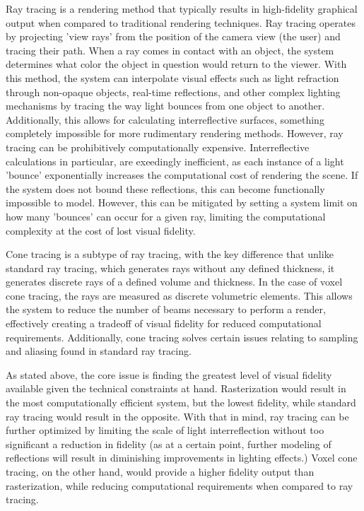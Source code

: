 \documentclass[onecolumn, draftclsnofoot,10pt, compsoc]{IEEEtran}
\newcounter{threesection}[subsubsection]
\newcounter{foursection}[threesection]
\begin{document}
Ray tracing is a rendering method that typically results in high-fidelity graphical output when compared to traditional rendering techniques. Ray tracing operates by projecting 'view rays' from the position of the camera view (the user) and tracing their path. When a ray comes in contact with an object, the system determines what color the object in question would return to the viewer. With this method, the system can interpolate visual effects such as light refraction through non-opaque objects, real-time reflections, and other complex lighting mechanisms by tracing the way light bounces from one object to another. Additionally, this allows for calculating interreflective surfaces, something completely impossible for more rudimentary rendering methods. However, ray tracing can be prohibitively computationally expensive. Interreflective calculations in particular, are exeedingly inefficient, as each instance of a light 'bounce' exponentially increases the computational cost of rendering the scene. If the system does not bound these reflections, this can become functionally impossible to model. However, this can be mitigated by setting a system limit on how many 'bounces' can occur for a given ray, limiting the computational complexity at the cost of lost visual fidelity. 

Cone tracing is a subtype of ray tracing, with the key difference that unlike standard ray tracing, which generates rays without any defined thickness, it generates discrete rays of a defined volume and thickness. In the case of voxel cone tracing, the rays are measured as discrete volumetric elements. This allows the system to reduce the number of beams necessary to perform a render, effectively creating a tradeoff of visual fidelity for reduced computational requirements. Additionally, cone tracing solves certain issues relating to sampling and aliasing found in standard ray tracing.

As stated above, the core issue is finding the greatest level of visual fidelity available given the technical constraints at hand. Rasterization would result in the most computationally efficient system, but the lowest fidelity, while standard ray tracing would result in the opposite. With that in mind, ray tracing can be further optimized by limiting the scale of light interreflection without too significant a reduction in fidelity (as at a certain point, further modeling of reflections will result in diminishing improvements in lighting effects.) Voxel cone tracing, on the other hand, would provide a higher fidelity output than rasterization, while reducing computational requirements when compared to ray tracing.
\end{document}

